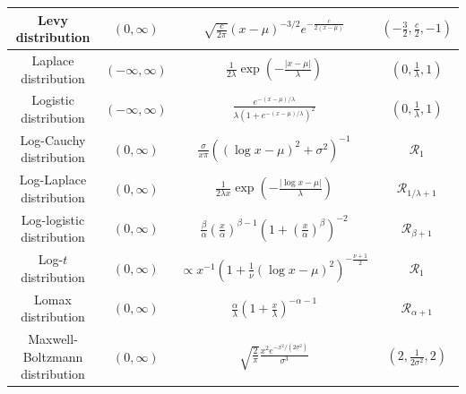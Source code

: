 \documentclass[../thesis.tex]{subfiles}
\begin{document}
{\begin{longtable}{|c|c|c|c|}
      \hline
      Levy distribution                                                     & $(0,\infty)$                                            & $\sqrt{\frac{c}{2\pi}}(x-\mu)^{-3/2}e^{-\frac{c}{2(x-\mu)}}$                                                                    & $(-\frac{3}{2},\frac{c}{2},-1)$\tabularnewline
      \hline
      Laplace distribution                                                  & $(-\infty,\infty)$                                      & $\frac{1}{2\lambda}\exp\left(-\frac{|x-\mu|}{\lambda}\right)$                                                                   & $(0,\frac{1}{\lambda},1)$\tabularnewline
      \hline
      Logistic distribution                                                 & $(-\infty,\infty)$                                      & $\frac{e^{-(x-\mu)/\lambda}}{\lambda(1+e^{-(x-\mu)/\lambda})^{2}}$                                                              & $(0,\frac{1}{\lambda},1)$\tabularnewline
      \hline
      Log-Cauchy distribution                                               &
      $(0,\infty)$                                                          & $\frac{\sigma}{x\pi}((\log x - \mu)^2 + \sigma^2)^{-1}$ & $\mathcal{R}_1$\tabularnewline
      \hline
      Log-Laplace distribution                                              & $(0,\infty)$                                            & $\frac{1}{2\lambda x}\exp\left(-\frac{\left|\log x-\mu\right|}{\lambda}\right)$                                                 & $\mathcal{R}_{1/\lambda+1}$\tabularnewline
      \hline
      Log-logistic distribution                                             & $(0,\infty)$                                            & $\frac{\beta}{\alpha}\left(\frac{x}{\alpha}\right)^{\beta-1}\left(1+\left(\frac{x}{\alpha}\right)^{\beta}\right)^{-2}$          & $\mathcal{R}_{\beta+1}$\tabularnewline
      \hline
      Log-$t$ distribution                                                  &
      $(0,\infty)$                                                          &
      $\propto x^{-1} (1 + \frac1{\nu}(\log x - \mu)^2)^{-\frac{\nu+1}{2}}$ & $\mathcal{R}_1$\tabularnewline
      \hline
      Lomax distribution                                                    & $(0,\infty)$                                            & $\frac{\alpha}{\lambda}\left(1+\frac{x}{\lambda}\right)^{-\alpha-1}$                                                            & $\mathcal{R}_{\alpha+1}$\tabularnewline
      \hline
      Maxwell-Boltzmann distribution                                        & $(0,\infty)$                                            & $\sqrt{\frac{2}{\pi}}\frac{x^{2}e^{-x^{2}/(2\sigma^{2})}}{\sigma^{3}}$                                                          & $(2,\frac{1}{2\sigma^{2}},2)$\tabularnewline

\end{longtable}}
\end{document}
